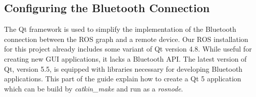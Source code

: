 \subsection{Configuring the Bluetooth Connection}

The Qt framework is used to simplify the implementation of the Bluetooth connection between the \ac{ROS} graph and a remote device. Our \ac{ROS} installation for this project already includes some variant of Qt version 4.8. While useful for creating new \ac{GUI} applications, it lacks a Bluetooth API. The latest version of Qt, version 5.5, is equipped with libraries necessary for developing Bluetooth applications. This part of the guide explain how to create a Qt 5 application which can be build by \textit{catkin\_make} and run as a \textit{rosnode}.
